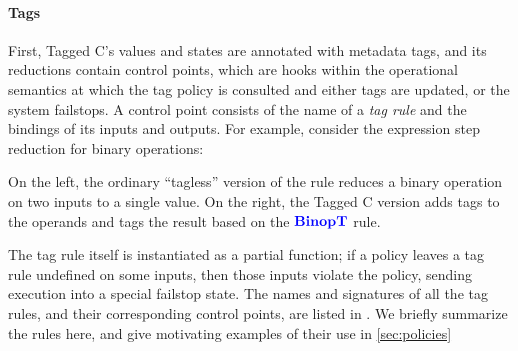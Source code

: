 \documentclass{llncs}
\begin{document}
\paragraph{Tags}
First, Tagged C's values
and states are annotated with metadata tags, and its reductions contain
control points, which are hooks within the
operational semantics at which the tag policy is consulted and either tags are updated, or the system
failstops. A control point consists of the name of a {\em tag rule}
and the bindings of its inputs and outputs. For example, consider the expression step reduction
for binary operations:

\begin{minipage}[t]{0.37\textwidth}
  \binopsteptagless
\end{minipage}
\begin{minipage}[t]{0.6\textwidth}
  \binopstep
\end{minipage}

\noindent
On the left, the ordinary ``tagless'' version of the rule reduces a
binary operation on two inputs to a single value.
On the right, the Tagged C version adds tags to the operands and tags the result
based on the \(\color{blue} \mathbf{BinopT}\) rule. 

The tag rule itself is instantiated as a partial function; if a policy leaves a tag rule
undefined on some inputs, then those inputs violate the policy, sending
execution into a special failstop state. The names and signatures of all the tag rules,
and their corresponding control points, are listed in .
We briefly summarize the rules here, and give motivating examples of their use in \cref{sec:policies}
\end{document}
